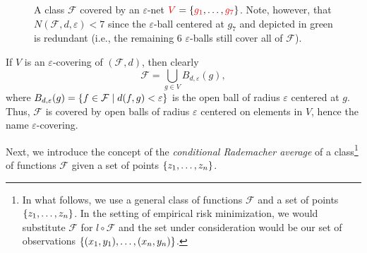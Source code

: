 \begin{figure}
    \centering
    \caption{%
         A class $\mathcal{F}$ covered by an $\varepsilon$-net ${\color{red} V} = \left\{{\color{red} g_1}, \dots, {\color{red} g_7}\right\}$. Note, however, that $N(\mathcal{F}, d, \varepsilon) < 7$ since the $\varepsilon$-ball centered at $g_7$ and depicted in green is redundant (i.e., the remaining 6 $\varepsilon$-balls still cover all of $\mathcal{F}$).
    }
    \label{fig: epsilon-net}
\end{figure}

If $V$ is an $\varepsilon$-covering of $(\mathcal{F}, d)$, then clearly
\[
    \mathcal{F} = \bigcup_{g \in V} B_{d, \varepsilon}(g),
\]
where $B_{d, \varepsilon}(g) = \left\{f \in \mathcal{F} \mathrel{|} d(f, g) < \varepsilon\right\}$ is the open ball of radius $\varepsilon$ centered at $g$. Thus, $\mathcal{F}$ is covered by open balls of radius $\varepsilon$ centered on elements in $V$, hence the name $\varepsilon$-covering.

Next, we introduce the concept of the \emph{conditional Rademacher average} of a class\footnote{In what follows, we use a general class of functions $\mathcal{F}$ and a set of points $\left\{z_1, \dots, z_n\right\}$. In the setting of empirical risk minimization, we would substitute $\mathcal{F}$ for $l \circ \mathcal{F}$ and the set under consideration would be our set of observations $\left\{(x_1, y_1), \dots, (x_n, y_n)\right\}$.} of functions $\mathcal{F}$ given a set of points $\left\{z_1, \dots, z_n\right\}$.

